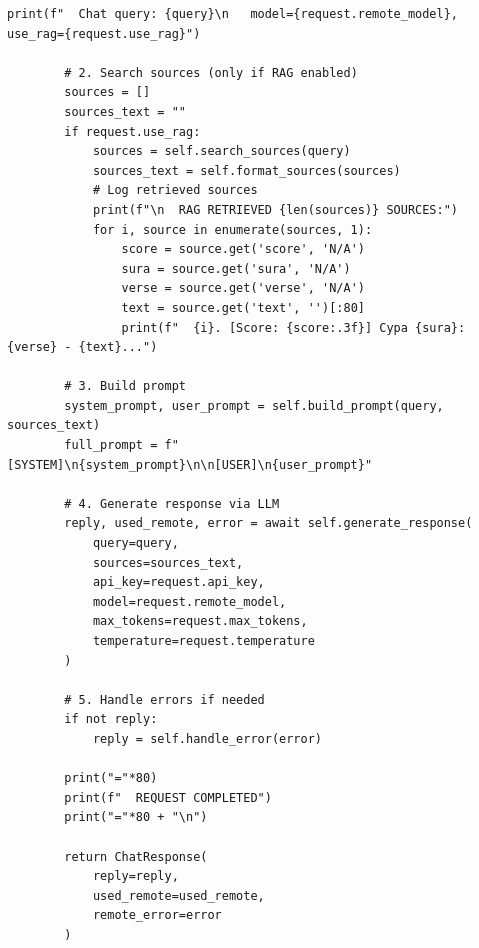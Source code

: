 \begin{lstlisting}[basicstyle=\tiny\ttfamily,breaklines=true]
        print(f"  Chat query: {query}\n   model={request.remote_model}, use_rag={request.use_rag}")

        # 2. Search sources (only if RAG enabled)
        sources = []
        sources_text = ""
        if request.use_rag:
            sources = self.search_sources(query)
            sources_text = self.format_sources(sources)
            # Log retrieved sources
            print(f"\n  RAG RETRIEVED {len(sources)} SOURCES:")
            for i, source in enumerate(sources, 1):
                score = source.get('score', 'N/A')
                sura = source.get('sura', 'N/A')
                verse = source.get('verse', 'N/A')
                text = source.get('text', '')[:80]
                print(f"  {i}. [Score: {score:.3f}] Сура {sura}:{verse} - {text}...")

        # 3. Build prompt
        system_prompt, user_prompt = self.build_prompt(query, sources_text)
        full_prompt = f"[SYSTEM]\n{system_prompt}\n\n[USER]\n{user_prompt}"

        # 4. Generate response via LLM
        reply, used_remote, error = await self.generate_response(
            query=query,
            sources=sources_text,
            api_key=request.api_key,
            model=request.remote_model,
            max_tokens=request.max_tokens,
            temperature=request.temperature
        )

        # 5. Handle errors if needed
        if not reply:
            reply = self.handle_error(error)

        print("="*80)
        print(f"  REQUEST COMPLETED")
        print("="*80 + "\n")

        return ChatResponse(
            reply=reply,
            used_remote=used_remote,
            remote_error=error
        )
\end{lstlisting}


